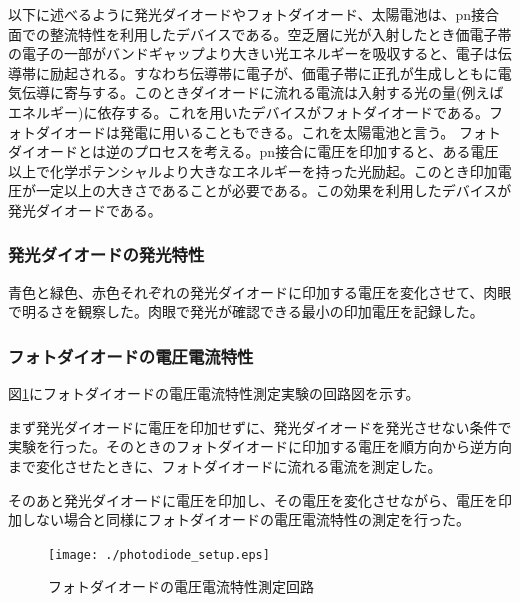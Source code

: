 \documentclass[11pt,a4]{jarticle}
\begin{document}
以下に述べるように発光ダイオードやフォトダイオード、太陽電池は、pn接合面での整流特性を利用したデバイスである。空乏層に光が入射したとき価電子帯の電子の一部がバンドギャップより大きい光エネルギーを吸収すると、電子は伝導帯に励起される。すなわち伝導帯に電子が、価電子帯に正孔が生成しともに電気伝導に寄与する。このときダイオードに流れる電流は入射する光の量(例えばエネルギー)に依存する。これを用いたデバイスがフォトダイオードである。フォトダイオードは発電に用いることもできる。これを太陽電池と言う。
フォトダイオードとは逆のプロセスを考える。pn接合に電圧を印加すると、ある電圧以上で化学ポテンシャルより大きなエネルギーを持った光励起。このとき印加電圧が一定以上の大きさであることが必要である。この効果を利用したデバイスが発光ダイオードである。


\subsubsection{発光ダイオードの発光特性}
青色と緑色、赤色それぞれの発光ダイオードに印加する電圧を変化させて、肉眼で明るさを観察した。肉眼で発光が確認できる最小の印加電圧を記録した。

\subsubsection{フォトダイオードの電圧電流特性}
図\ref{fig:photodiode_setup}にフォトダイオードの電圧電流特性測定実験の回路図を示す。

まず発光ダイオードに電圧を印加せずに、発光ダイオードを発光させない条件で実験を行った。そのときのフォトダイオードに印加する電圧を順方向から逆方向まで変化させたときに、フォトダイオードに流れる電流を測定した。

そのあと発光ダイオードに電圧を印加し、その電圧を変化させながら、電圧を印加しない場合と同様にフォトダイオードの電圧電流特性の測定を行った。
\begin{figure}[!htbp]
   \begin{center}
    \texttt{[image: ./photodiode\_setup.eps]}
    \caption{フォトダイオードの電圧電流特性測定回路}
     \label{fig:photodiode_setup}
   \end{center}
\end{figure}
\end{document}
